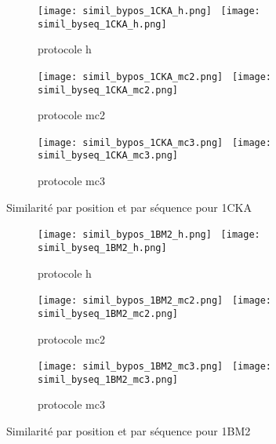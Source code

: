    \begin{figure}
   \begin{subfigure}[b]{\linewidth}
     \centering
          \texttt{[image: simil\_bypos\_1CKA\_h.png]}~
          \texttt{[image: simil\_byseq\_1CKA\_h.png]} 
     \caption{protocole h}
   \end{subfigure}

   \begin{subfigure}[b]{\linewidth}
     \centering
          \texttt{[image: simil\_bypos\_1CKA\_mc2.png]}~ 
          \texttt{[image: simil\_byseq\_1CKA\_mc2.png]} 
     \caption{protocole mc2}
   \end{subfigure}

   \begin{subfigure}[b]{\linewidth}
     \centering
          \texttt{[image: simil\_bypos\_1CKA\_mc3.png]}~  
          \texttt{[image: simil\_byseq\_1CKA\_mc3.png]} 
     \caption{protocole mc3}
   \end{subfigure}

     \caption{Similarité par position et par séquence pour 1CKA}
\label{grah:simil_1CKA}
   \end{figure}

   \begin{figure}
   \begin{subfigure}[b]{\linewidth}
     \centering
          \texttt{[image: simil\_bypos\_1BM2\_h.png]}~
          \texttt{[image: simil\_byseq\_1BM2\_h.png]} 
     \caption{protocole h}
   \end{subfigure}

   \begin{subfigure}[b]{\linewidth}
     \centering
          \texttt{[image: simil\_bypos\_1BM2\_mc2.png]}~ 
          \texttt{[image: simil\_byseq\_1BM2\_mc2.png]} 
     \caption{protocole mc2}
   \end{subfigure}

   \begin{subfigure}[b]{\linewidth}
     \centering
          \texttt{[image: simil\_bypos\_1BM2\_mc3.png]}~  
          \texttt{[image: simil\_byseq\_1BM2\_mc3.png]} 
     \caption{protocole mc3}
   \end{subfigure}

     \caption{Similarité par position et par séquence pour 1BM2}
\label{grah:simil_1BM2}
   \end{figure}

